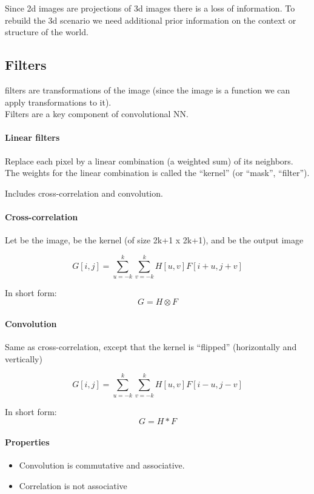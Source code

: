 Since 2d images are projections of 3d images there is a loss of information.
To rebuild the 3d scenario we need additional prior information on the context or
structure of the world.



\subsection[short]{Filters}
filters are transformations of the image (since the image is a function we can
apply transformations to it).\\
Filters are a key component of convolutional NN.

\paragraph*{Linear filters}
Replace each pixel by a linear combination (a weighted
sum) of its neighbors.
The weights for the linear combination is called the
“kernel” (or “mask”, “filter”).

Includes cross-correlation and convolution.

\paragraph*{Cross-correlation}
Let be the image, be the kernel (of
size 2k+1 x 2k+1), and be the output
image

\[
    G[i,j] = \sum_{u=-k}^{k} \sum_{v=-k}^{k} H[u,v] F[i+u, j+v]
\]

In short form:
\[
    G = H \otimes F
\]

\paragraph*{Convolution}
Same as cross-correlation, except that the
kernel is “flipped” (horizontally and vertically)

\[
    G[i,j] = \sum_{u=-k}^{k} \sum_{v=-k}^{k} H[u,v] F[i-u, j-v]
\]

In short form:
\[
    G = H * F
\]

\paragraph*{Properties}
\begin{itemize}
    \item Convolution is commutative and associative.
    \item Correlation is not associative
\end{itemize}



